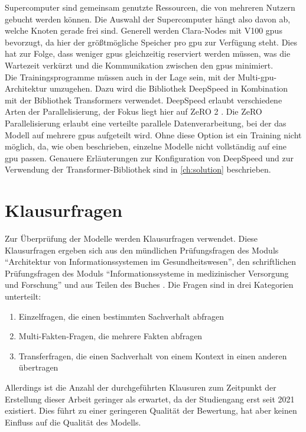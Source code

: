 Supercomputer sind gemeinsam genutzte Ressourcen, die von mehreren Nutzern gebucht werden können.
Die Auswahl der Supercomputer hängt also davon ab, welche Knoten gerade frei sind.
Generell werden Clara-Nodes mit V100 \ac{gpu}s bevorzugt, da hier der größtmögliche Speicher pro \ac{gpu} zur Verfügung steht.
Dies hat zur Folge, dass weniger \ac{gpu}s gleichzeitig reserviert werden müssen, was die Wartezeit verkürzt und die Kommunikation zwischen den \ac{gpu}s minimiert.\\

Die Trainingsprogramme müssen auch in der Lage sein, mit der Multi-\ac{gpu}-Architektur umzugehen.
Dazu wird die Bibliothek DeepSpeed \citep{deepspeed} in Kombination mit der Bibliothek Transformers verwendet.
DeepSpeed erlaubt verschiedene Arten der Parallelisierung, der Fokus liegt hier auf ZeRO 2 \citep{ZeRO}.
Die ZeRO Parallelisierung erlaubt eine verteilte parallele Datenverarbeitung, bei der das Modell auf mehrere \ac{gpu}s aufgeteilt wird.
Ohne diese Option ist ein Training nicht möglich, da, wie oben beschrieben, einzelne Modelle nicht vollständig auf eine \ac{gpu} passen.
Genauere Erläuterungen zur Konfiguration von DeepSpeed und zur Verwendung der Transformer-Bibliothek sind in \cref{ch:solution} beschrieben.

\section{Klausurfragen}\label{sec:approach:questions}
Zur Überprüfung der Modelle werden Klausurfragen verwendet.
Diese Klausurfragen ergeben sich aus den mündlichen Prüfungsfragen des Moduls \enquote{Architektur von Informationssystemen im Gesundheitswesen},
den schriftlichen Prüfungsfragen des Moduls \enquote{Informationssysteme in medizinischer Versorgung und Forschung} und aus Teilen des Buches \citet{bb}.
Die Fragen sind in drei Kategorien unterteilt:
\begin{enumerate}
    \item Einzelfragen, die einen bestimmten Sachverhalt abfragen
    \item Multi-Fakten-Fragen, die mehrere Fakten abfragen
    \item Transferfragen, die einen Sachverhalt von einem Kontext in einen anderen übertragen
\end{enumerate}

Allerdings ist die Anzahl der durchgeführten Klausuren zum Zeitpunkt der Erstellung dieser Arbeit geringer als erwartet, da der Studiengang erst seit 2021 existiert.
Dies führt zu einer geringeren Qualität der Bewertung,
hat aber keinen Einfluss auf die Qualität des Modells.\\

